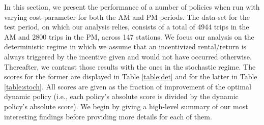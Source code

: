 In this section, we present the performance of a number of policies when run with varying cost-parameter for both the AM and PM periods.  %
The data-set for the test period, on which our analysis relies, consists of a total of 4944 trips in the AM and 2800 trips in the PM, across 147 stations. We focus our analysis on the deterministic regime in which we assume that an incentivized rental/return is always triggered by the incentive given and would not have occurred otherwise. Thereafter, we contrast those results with the ones in the stochastic regime. The scores for the former are displayed in Table \ref{table:det} and for the latter in Table \ref{table:stoch}. All scores are given as the fraction of improvement of the %
optimal dynamic policy (i.e., each policy's absolute score is divided by the dynamic policy's absolute score). We begin by giving a high-level summary of our most interesting findings before providing more details for each of them.


